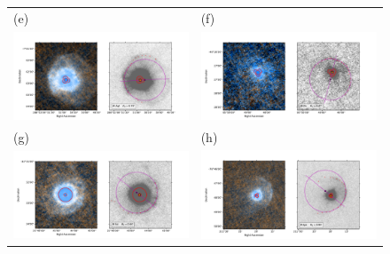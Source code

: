 \begin{figure}
\begin{tabular}{ll}
    (e) & (f) \\
    \includegraphics[trim=10 0 65 20, clip]{figs/waql-imageplot}
    & \includegraphics[trim=10 0 65 20, clip]{figs/wpic-imageplot} \\
    (g) & (h) \\
    \includegraphics[trim=10 0 65 20, clip]{figs/rscl-imageplot}
    & \includegraphics[trim=10 0 65 20, clip]{figs/tetaps-imageplot}

\end{tabular}
\end{figure}
